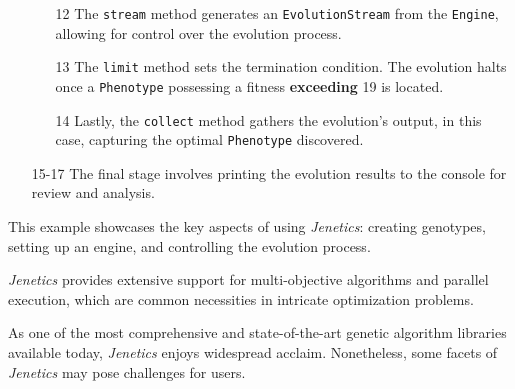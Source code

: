 \begin{enumerate}
\begin{enumerate}
        \item[12] The \texttt{stream} method generates an 
          \texttt{EvolutionStream} from the \texttt{Engine}, allowing for 
          control over the evolution process.
        \item[13] The \texttt{limit} method sets the termination condition.
          The evolution halts once a \texttt{Phenotype} possessing a fitness 
          \textbf{exceeding} 19 is located.
        \item[14] Lastly, the \texttt{collect} method gathers the evolution's 
          output, in this case, capturing the optimal \texttt{Phenotype} 
          discovered.
      \end{enumerate}
    \item[15-17] The final stage involves printing the evolution results to the 
      console for review and analysis.
  \end{enumerate}

  This example showcases the key aspects of using \textit{Jenetics}: creating 
  genotypes, setting up an engine, and controlling the evolution process.

  \textit{Jenetics} provides extensive support for multi-objective algorithms 
  and parallel execution, which are common necessities in intricate optimization
  problems.

  As one of the most comprehensive and state-of-the-art genetic algorithm
  libraries available today, \textit{Jenetics} enjoys widespread acclaim.
  Nonetheless, some facets of \textit{Jenetics} may pose challenges for users.

